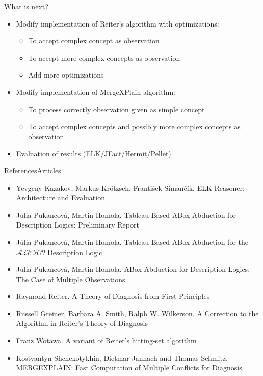 \documentclass{beamer}
\begin{document}
\begin{frame}{What is next?}
	\begin{itemize}		
		\item Modify implementation of Reiter's algorithm with optimizations:
		\begin{itemize}
			\item To accept complex concept as observation
			\item To accept more complex concepts as observation
			\item Add more optimizations
		\end{itemize}
		
		\item Modify implementation of MergeXPlain algorithm:
		\begin{itemize}
			\item To process correctly observation given as simple concept
			\item To accept complex concepts and possibly more complex concepts as observation
		\end{itemize}		
		\item {
			Evaluation of results (ELK/JFact/Hermit/Pellet)
		}		
	\end{itemize}
\end{frame}


\begin{frame}{References}{Articles}
	\begin{itemize}
	\item {
		Yevgeny Kazakov, Markus Krötzsch, František Simančík. ELK Reasoner: Architecture and Evaluation
	}
	\item {
		Júlia Pukancová, Martin Homola. Tableau-Based ABox Abduction for Description Logics: Preliminary Report
	}
	\item {
		Júlia Pukancová, Martin Homola. Tableau-Based ABox Abduction for the 		$\mathcal{ALCHO}$ Description Logic
	}
	\item {
		Júlia Pukancová, Martin Homola. ABox Abduction for Description Logics: The Case of Multiple Observations
	}
	\item {
		Raymond Reiter. A Theory of Diagnosis from First Principles
	}
	\item {
		Russell Greiner, Barbara A. Smith, Ralph W. Wilkerson. A Correction to the Algorithm in Reiter's Theory of Diagnosis
	}
	\item {
		Franz Wotawa. A variant of Reiter’s hitting-set algorithm
	}
	\item {
		Kostyantyn Shchekotykhin, Dietmar Jannach and Thomas Schmitz. MERGEXPLAIN: Fast Computation of Multiple Conflicts for Diagnosis
	}
	\end{itemize}
\end{frame}
\end{document}
